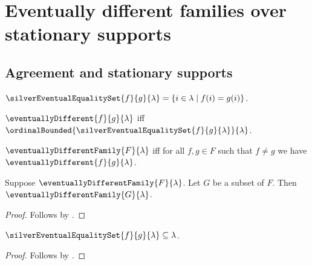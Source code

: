\section{Eventually different families over stationary supports}





\subsection{Agreement and stationary supports}

\begin{definition}\label{silver_eventual_equality_set}
    $\silverEventualEqualitySet{f}{g}{\lambda}
        =\{i\in\lambda\mid f(i)=g(i)\}$.
\end{definition}

\begin{definition}\label{eventually_different}
    $\eventuallyDifferent{f}{g}{\lambda}$ iff
        $\ordinalBounded{\silverEventualEqualitySet{f}{g}{\lambda}}
            {\lambda}$.
\end{definition}

\begin{definition}\label{eventually_different_family}
    $\eventuallyDifferentFamily{F}{\lambda}$ iff
        for all $f,g\in F$ such that $f\neq g$ we have
            $\eventuallyDifferent{f}{g}{\lambda}$.
\end{definition}

\begin{proposition}\label{eventually_different_family_subset}
    Suppose $\eventuallyDifferentFamily{F}{\lambda}$.
    Let $G$ be a subset of $F$.
    Then $\eventuallyDifferentFamily{G}{\lambda}$.
\end{proposition}
\begin{proof}
    Follows by .
\end{proof}

\begin{proposition}\label{silver_eventual_equality_set_subseteq}
    $\silverEventualEqualitySet{f}{g}{\lambda}\subseteq\lambda$.
\end{proposition}
\begin{proof}
    Follows by .
\end{proof}


